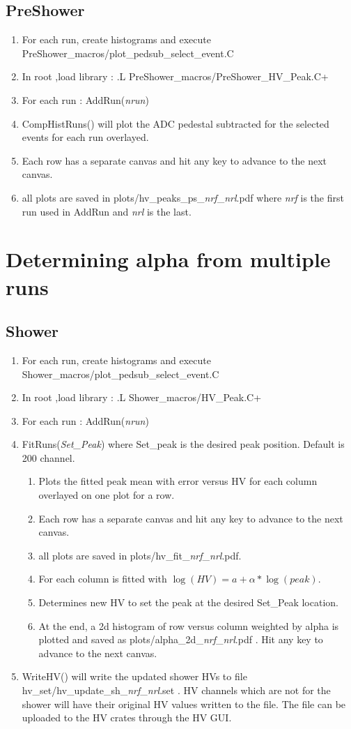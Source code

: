 \documentclass[]{article}
\begin{document}
\subsection{PreShower}
\begin{enumerate}
	\item For each run, create histograms and execute PreShower\_macros/plot\_pedsub\_select\_event.C
	\item In root ,load library : .L PreShower\_macros/PreShower\_HV\_Peak.C+
	\item For each run : AddRun({\it nrun}) 
	\item CompHistRuns() will plot the ADC pedestal subtracted for the selected events for each run overlayed. \item Each row has a separate canvas and hit any key to advance to the next canvas.
	\item all plots are saved in plots/hv\_peaks\_ps\_{\it nrf}\_{\it nrl}.pdf where {\it nrf} is the first run used in AddRun and {\it nrl} is the last.
\end{enumerate}
\section{Determining alpha from multiple runs}
\subsection{Shower}
\begin{enumerate}
	\item For each run, create histograms and execute Shower\_macros/plot\_pedsub\_select\_event.C
	\item In root ,load library : .L Shower\_macros/HV\_Peak.C+
	\item For each run : AddRun({\it nrun}) 
	\item FitRuns({\it Set\_Peak}) where Set\_peak is the desired peak position. Default is 200 channel.
	\begin{enumerate}
		\item Plots the fitted peak mean with error versus HV for each column overlayed on one plot for a row. 
		\item Each row has a separate canvas and  hit any key to advance to the next canvas.
		\item all plots are saved in plots/hv\_fit\_{\it nrf}\_{\it nrl}.pdf. \item For each column is fitted with $\log(HV) = a + \alpha*\log(peak)$.
		\item Determines new HV to set the peak at the desired Set\_Peak location.
		\item  At the end, a 2d histogram of row versus column weighted by alpha is plotted and saved as plots/alpha\_2d\_{\it nrf}\_{\it nrl}.pdf . Hit any key to advance to the next canvas.
	\end{enumerate}
    \item WriteHV() will write the updated shower HVs to  file hv\_set/hv\_update\_sh\_{\it nrf}\_{\it nrl}.set . HV channels which are not for the shower will have their original HV values written to the file. The file can be uploaded to the HV crates through the HV GUI.
    \end{enumerate}
\end{document}
